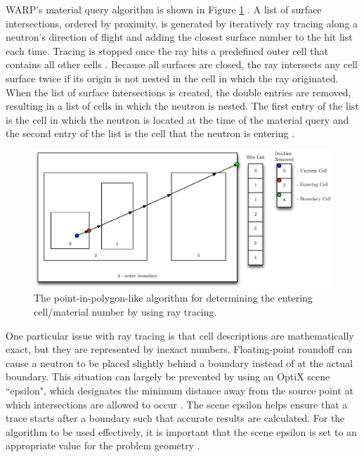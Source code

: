 WARP's material query algorithm is shown in Figure \ref{whereami} \cite{warp2015}. A list of surface
intersections, ordered by proximity, is generated by iteratively ray tracing along a neutron's direction
of flight and adding the closest surface number to the hit list each time. Tracing is stopped once the
ray hits a predefined outer cell that contains all other cells \cite{warp2015}. Because all surfaces are
closed, the ray intersects any cell surface twice if its origin is not nested in the cell in which the ray
originated. When the list of surface intersections is created, the double entries are removed, resulting 
in a list of cells in which the neutron is nested. The first entry of the list is the cell in which the 
neutron is located at the time of the material query and the second entry of the list is the cell that the
neutron is entering \cite{warp2015}.

\begin{figure}[h!] 
  \centering
    \includegraphics[width=1.0\textwidth]{img/whereami.eps}
     \caption{The point-in-polygon-like algorithm for determining the entering cell/material number by 
		using ray tracing. \label{whereami} }
\end{figure}

One particular issue with ray tracing is that cell descriptions are mathematically exact, but they are
represented by inexact numbers. Floating-point roundoff can cause a neutron to be placed slightly behind
a boundary instead of at the actual boundary. This situation can largely be prevented by using an OptiX 
scene ``epsilon", which designates the minimum distance away from the source point at which intersections 
are allowed to occur \cite{warp2015}. The scene epsilon helps ensure that a trace starts after a boundary
such that accurate results are calculated. For the algorithm to be used effectively, it is important that
the scene epsilon is set to an appropriate value for the problem geometry \cite{warp2015}.

